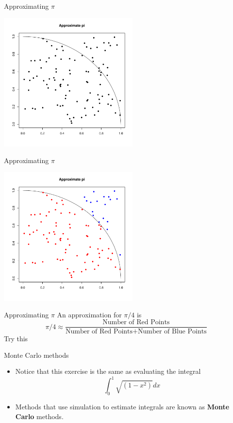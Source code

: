 \documentclass
[handout]
{beamer}
\begin{document}
\begin{frame}{Approximating $\pi$}
\begin{center}
\includegraphics[height=7cm]{./Pics/appi2.pdf}
\end{center}
\end{frame}
\begin{frame}{Approximating $\pi$}
\begin{center}
\includegraphics[height=7cm]{./Pics/appi3.pdf}
\end{center}
\end{frame}
\begin{frame}{Approximating $\pi$}
An approximation for $\pi/4$ is
\pause
\begin{equation*}
\pi/4\approx\frac{\mbox{Number of Red Points}}{\mbox{Number of Red Points}+\mbox{Number of Blue Points}}
\end{equation*}
Try this

\end{frame}
\begin{frame}{Monte Carlo methods}
\begin{itemize}
\item Notice that this exercise is the same as evaluating the integral
\begin{equation}
\int_0^1 \sqrt{(1-x^2)}dx
\end{equation}
\pause
\item Methods that use simulation to estimate integrals are known as {\bf Monte Carlo} methods.
\end{itemize}
\end{frame}
\end{document}
